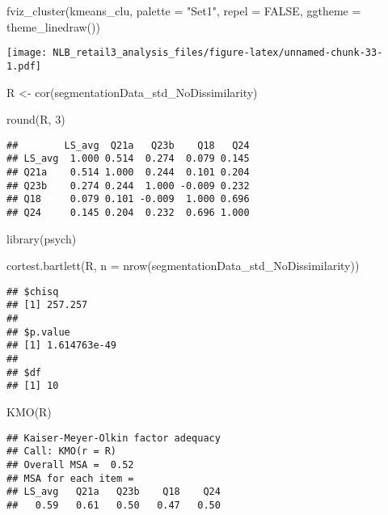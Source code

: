 \documentclass[
]{article}
\newenvironment{Shaded}{\begin{snugshade}}{\end{snugshade}}
\newcommand{\AttributeTok}[1]{\textcolor[rgb]{0.77,0.63,0.00}{#1}}
\newcommand{\ConstantTok}[1]{\textcolor[rgb]{0.00,0.00,0.00}{#1}}
\newcommand{\DecValTok}[1]{\textcolor[rgb]{0.00,0.00,0.81}{#1}}
\newcommand{\FunctionTok}[1]{\textcolor[rgb]{0.00,0.00,0.00}{#1}}
\newcommand{\NormalTok}[1]{#1}
\newcommand{\OtherTok}[1]{\textcolor[rgb]{0.56,0.35,0.01}{#1}}
\newcommand{\StringTok}[1]{\textcolor[rgb]{0.31,0.60,0.02}{#1}}
\begin{document}
\begin{Shaded}
\begin{Highlighting}[]
\FunctionTok{fviz\_cluster}\NormalTok{(kmeans\_clu, }\AttributeTok{palette =} \StringTok{"Set1"}\NormalTok{, }\AttributeTok{repel =} \ConstantTok{FALSE}\NormalTok{, }\AttributeTok{ggtheme =} \FunctionTok{theme\_linedraw}\NormalTok{())}
\end{Highlighting}
\end{Shaded}

\texttt{[image: NLB\_retail3\_analysis\_files/figure-latex/unnamed-chunk-33-1.pdf]}

\begin{Shaded}
\begin{Highlighting}[]
\NormalTok{R }\OtherTok{\textless{}{-}} \FunctionTok{cor}\NormalTok{(segmentationData\_std\_NoDissimilarity)}

\FunctionTok{round}\NormalTok{(R, }\DecValTok{3}\NormalTok{)}
\end{Highlighting}
\end{Shaded}

\begin{verbatim}
##        LS_avg  Q21a   Q23b    Q18   Q24
## LS_avg  1.000 0.514  0.274  0.079 0.145
## Q21a    0.514 1.000  0.244  0.101 0.204
## Q23b    0.274 0.244  1.000 -0.009 0.232
## Q18     0.079 0.101 -0.009  1.000 0.696
## Q24     0.145 0.204  0.232  0.696 1.000
\end{verbatim}

\begin{Shaded}
\begin{Highlighting}[]
\FunctionTok{library}\NormalTok{(psych)}

\FunctionTok{cortest.bartlett}\NormalTok{(R, }\AttributeTok{n =} \FunctionTok{nrow}\NormalTok{(segmentationData\_std\_NoDissimilarity))}
\end{Highlighting}
\end{Shaded}

\begin{verbatim}
## $chisq
## [1] 257.257
## 
## $p.value
## [1] 1.614763e-49
## 
## $df
## [1] 10
\end{verbatim}

\begin{Shaded}
\begin{Highlighting}[]
\FunctionTok{KMO}\NormalTok{(R)}
\end{Highlighting}
\end{Shaded}

\begin{verbatim}
## Kaiser-Meyer-Olkin factor adequacy
## Call: KMO(r = R)
## Overall MSA =  0.52
## MSA for each item = 
## LS_avg   Q21a   Q23b    Q18    Q24 
##   0.59   0.61   0.50   0.47   0.50
\end{verbatim}
\end{document}
